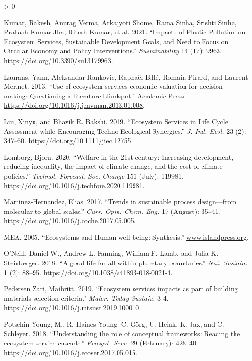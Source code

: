 \documentclass[
  14pt,
]{extarticle}
\newlength{\cslhangindent}
\newenvironment{CSLReferences}[2] %
 {%
  \setlength{\parindent}{0pt}
  \ifodd #1 \everypar{\setlength{\hangindent}{\cslhangindent}}\ignorespaces\fi
  \ifnum #2 > 0
  \setlength{\parskip}{#2\baselineskip}
  \fi
 }%
 {}
\begin{document}
\begin{CSLReferences}{1}{0}
\leavevmode\hypertarget{ref-Kumar2021}{}%
Kumar, Rakesh, Anurag Verma, Arkajyoti Shome, Rama Sinha, Srishti Sinha, Prakash Kumar Jha, Ritesh Kumar, et al. 2021. {``{Impacts of Plastic Pollution on Ecosystem Services, Sustainable Development Goals, and Need to Focus on Circular Economy and Policy Interventions}.''} \emph{Sustainability} 13 (17): 9963. \url{https://doi.org/10.3390/su13179963}.

\leavevmode\hypertarget{ref-Laurans2013}{}%
Laurans, Yann, Aleksandar Rankovic, Raphaël Billé, Romain Pirard, and Laurent Mermet. 2013. {``{Use of ecosystem services economic valuation for decision making: Questioning a literature blindspot}.''} Academic Press. \url{https://doi.org/10.1016/j.jenvman.2013.01.008}.

\leavevmode\hypertarget{ref-Liu2019g}{}%
Liu, Xinyu, and Bhavik R. Bakshi. 2019. {``{Ecosystem Services in Life Cycle Assessment while Encouraging Techno-Ecological Synergies}.''} \emph{J. Ind. Ecol.} 23 (2): 347--60. \url{https://doi.org/10.1111/jiec.12755}.

\leavevmode\hypertarget{ref-Lomborg2020}{}%
Lomborg, Bjorn. 2020. {``{Welfare in the 21st century: Increasing development, reducing inequality, the impact of climate change, and the cost of climate policies}.''} \emph{Technol. Forecast. Soc. Change} 156 (July): 119981. \url{https://doi.org/10.1016/j.techfore.2020.119981}.

\leavevmode\hypertarget{ref-Martinez-Hernandez2017}{}%
Martinez-Hernandez, Elias. 2017. {``{Trends in sustainable process design---from molecular to global scales}.''} \emph{Curr. Opin. Chem. Eng.} 17 (August): 35--41. \url{https://doi.org/10.1016/j.coche.2017.05.005}.

\leavevmode\hypertarget{ref-MEA2005}{}%
MEA. 2005. {``{Ecosystems and Human well-being: Synthesis}.''} \href{https://www.islandpress.org}{www.islandpress.org}.

\leavevmode\hypertarget{ref-ONeill2018}{}%
O'Neill, Daniel W., Andrew L. Fanning, William F. Lamb, and Julia K. Steinberger. 2018. {``{A good life for all within planetary boundaries}.''} \emph{Nat. Sustain.} 1 (2): 88--95. \url{https://doi.org/10.1038/s41893-018-0021-4}.

\leavevmode\hypertarget{ref-PedersenZari2019}{}%
Pedersen Zari, Maibritt. 2019. {``{Ecosystem services impacts as part of building materials selection criteria}.''} \emph{Mater. Today Sustain.} 3-4. \url{https://doi.org/10.1016/j.mtsust.2019.100010}.

\leavevmode\hypertarget{ref-Potschin-Young2018}{}%
Potschin-Young, M., R. Haines-Young, C. Görg, U. Heink, K. Jax, and C. Schleyer. 2018. {``{Understanding the role of conceptual frameworks: Reading the ecosystem service cascade}.''} \emph{Ecosyst. Serv.} 29 (February): 428--40. \url{https://doi.org/10.1016/j.ecoser.2017.05.015}.


\end{CSLReferences}
\end{document}
